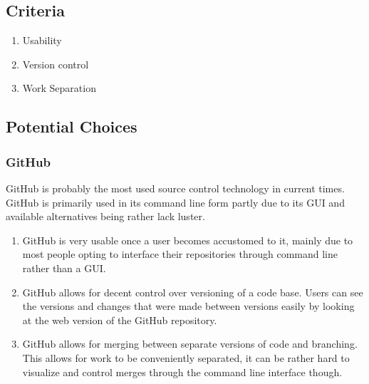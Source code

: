 \documentclass[onecolumn, draftclsnofoot,10pt, compsoc]{IEEEtran}
\begin{document}
\subsection{Criteria}
\begin{enumerate}
\item Usability
\item Version control
\item Work Separation
\end{enumerate}

\subsection{Potential Choices}

\subsubsection{GitHub}
GitHub is probably the most used source control technology in current times. GitHub is primarily used in its command line form partly due to its GUI and available alternatives being rather lack luster.
\begin{enumerate}
\item GitHub is very usable once a user becomes accustomed to it, mainly due to most people opting to interface their repositories through command line rather than a GUI.
\item GitHub allows for decent control over versioning of a code base. Users can see the versions and changes that were made between versions easily by looking at the web version of the GitHub repository.
\item GitHub allows for merging between separate versions of code and branching. This allows for work to be conveniently separated, it can be rather hard to visualize and control merges through the command line interface though.
\end{enumerate}
\end{document}
